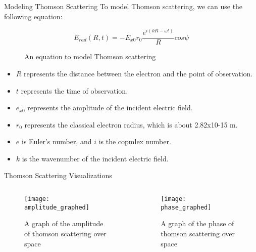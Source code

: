 \documentclass[aspectratio=169]{beamer}
\begin{document}
\begin{frame}[t]{Modeling Thomson Scattering}
	To model Thomson scattering, we can use the following equation:
				
	\begin{figure}
		$$ E_{rad}(R, t) = -E_{x0} {r_0} \frac{e^{i(kR-\omega t)}}{R} cos \psi$$
		\caption{An equation to model Thomson scattering}
	\end{figure}
	
	\begin{scriptsize}
		\begin{itemize}
	\item $R$ represents the distance between the electron and the point of observation.
						
	\item $t$ represents the time of observation.
						
	\item $e_{x0}$ represents the amplitude of the incident electric field.
						
	\item $r_0$ represents the classical electron radius, which is about 2.82x10-15 m.
						
	\item $e$ is Euler's number, and $i$ is the copmlex number.
						
	\item $k$ is the wavenumber of the incident electric field.
		\end{itemize}
	\end{scriptsize}						
\end{frame}

\begin{frame}{Thomson Scattering Visualizations}
	\begin{columns}
		\begin{column}{0.5\textwidth}
			\begin{figure}
				\texttt{[image: amplitude\_graphed]}
				\caption{A graph of the amplitude of thomson scattering over space}
			\end{figure}
		\end{column}
		
		\begin{column}{.5\textwidth}
			\begin{figure}
				\texttt{[image: phase\_graphed]}
				\caption{A graph of the phase of thomson scattering over space}
			\end{figure}			
		\end{column}
	\end{columns}
\end{frame}
	
\end{document}
